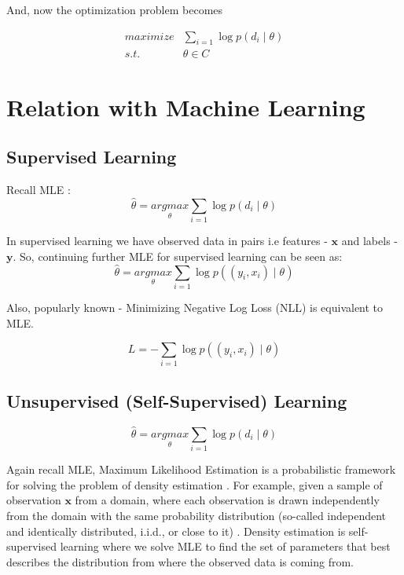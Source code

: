 And, now the optimization problem becomes

\begin{equation}\label{eq:cvx_mle_log}
\begin{array}{cc}
    maximize & \sum_{i=1} \log p(d_i \mid \theta) \\
    s.t. & \theta \in C
\end{array}
\end{equation}



\section{Relation with Machine Learning}
\subsection{Supervised Learning}
Recall MLE :
\begin{equation}
    \hat{\theta} = \underset{\theta}{argmax} \sum_{i=1} \log p(d_i \mid \theta)
\end{equation}

In supervised learning we have observed data in pairs i.e features - \textbf{$\mathbf{x}$} and labels -  \textbf{$\mathbf{y}$}. So, continuing further MLE for supervised learning can be seen as:
\begin{equation}
    \hat{\theta} = \underset{\theta}{argmax} \sum_{i=1} \log p( (y_i,x_i) \mid \theta)
\end{equation}

Also, popularly known -  Minimizing Negative Log Loss (NLL) is equivalent to MLE. 

\begin{equation}
L  = - \sum_{i=1} \log p( (y_i, x_i) \mid \theta)    
\end{equation}



\subsection{Unsupervised (Self-Supervised) Learning}

\begin{equation}
    \hat{\theta} = \underset{\theta}{argmax} \sum_{i=1} \log p(d_i \mid \theta)
\end{equation}

Again recall MLE, Maximum Likelihood Estimation is a probabilistic framework for solving the problem of density estimation \cite{mle-density}. For example, given a sample of observation $\mathbf{x}$ from a domain, where each observation is drawn independently from the domain with the same probability distribution (so-called independent and identically distributed, i.i.d., or close to it) \cite{mle-density}. Density estimation is self-supervised learning where we solve MLE to find the set of parameters that best describes the distribution from where the observed data is coming from.  

